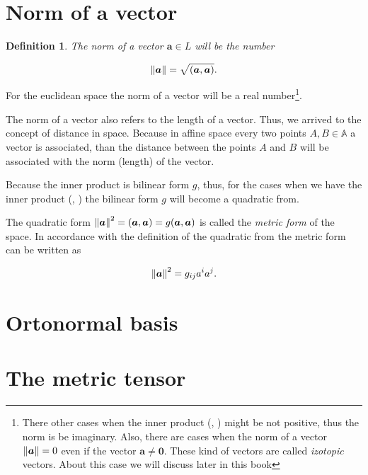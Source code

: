 \documentclass{book}
\newtheorem{definition}{Definition}
\begin{document}
\section{Norm of a vector}

\begin{definition}
The norm of a vector $\boldsymbol{a} \in L$ will be the number

\[\norm{\boldsymbol{a}} = \sqrt{(\boldsymbol{a}, \boldsymbol{a})}.\]

\end{definition}

For the euclidean space the norm of a vector will be a real number\footnote{There other cases when the inner product (, ) might be not positive, thus the norm is be imaginary. Also, there are cases when the norm of a vector $\norm{\boldsymbol{a}} = 0$ even if the vector $\boldsymbol{a} \neq \boldsymbol{0}$. These kind of vectors are called \emph{izotopic} vectors. About this case we will discuss later in this book}.

The norm of a vector also refers to the length of a vector. Thus, we arrived to the concept of distance in space. Because in affine space every two points $A, B \in \mathbb{A}$ a vector is associated, than the distance between the points $A$ and $B$ will be associated with the norm (length) of the vector.

Because the inner product is bilinear form $g$, thus, for the cases when we have the inner product (, ) the bilinear form $g$ will become a quadratic from.

The quadratic form $\norm{\boldsymbol{a}}^2 = (\boldsymbol{a}, \boldsymbol{a}) = g(\boldsymbol{a}, \boldsymbol{a})$ is called the \emph{metric form} of the space. In accordance with the definition of the quadratic from the metric form can be written as

\begin{align}
\norm{\boldsymbol{a}}^2 = g_{ij}a^ia^j. \label{matric_quadratic_from}  
\end{align}

\section{Ortonormal basis}

\section{The metric tensor}
\end{document}
